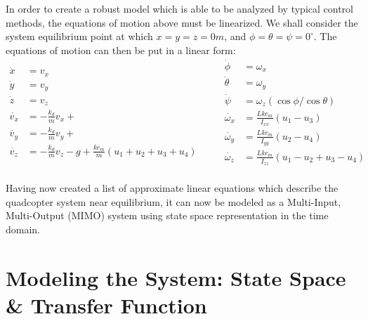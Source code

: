 \documentclass[12pt]{article}
\begin{document}
In order to create a robust model which is able to be analyzed by typical control methods, 
the equations of motion above must be linearized. We shall consider the 
system equilibrium point at which $x = y = z = 0m$, and $\phi = \theta = \psi = 0^{\circ}$.
The equations of motion can then be put in a linear form:
\begin{equation}
  \begin{split}
    \dot{x} &= v_x \\
    \dot{y} &= v_y \\
    \dot{z} &= v_z \\
    \dot{v_x} &= -\frac{k_d}{m}v_x +  \\
    \dot{v_y} &= -\frac{k_d}{m}v_y + \\
    \dot{v_z} &= -\frac{k_d}{m}v_z -g + \frac{kc_m}{m}(u_1 + u_2 + u_3 + u_4) \\
  \end{split}
\quad\quad
  \begin{split}
    \dot{\phi} &= \omega_x  \\
    \dot{\theta} &= \omega_y \\
    \dot{\psi} &= \omega_z(\cos\phi/\cos\theta) \\
    \dot{\omega_x} &= \frac{Lkc_m}{I_{xx}}(u_1 - u_3) \\
    \dot{\omega_y} &= \frac{Lkc_m}{I_{yy}}(u_2 - u_4)  \\
    \dot{\omega_z} &= \frac{Lkc_m}{I_{zz}}(u_1 - u_2 + u_3 - u_4) \\
  \end{split}
\end{equation}

Having now created a list of approximate linear equations which describe the 
quadcopter system near equilibrium, it can now be modeled as a Multi-Input, Multi-Output
(MIMO) system using state space representation in the time domain. 

\section{Modeling the System: State Space \& Transfer Function}
\end{document}
